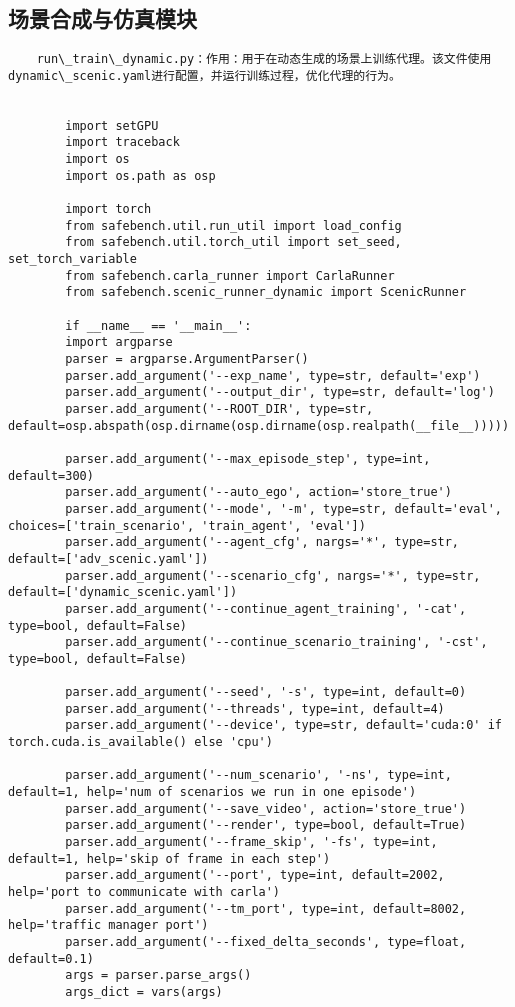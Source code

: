 \subsection*{场景合成与仿真模块}
\begin{lstlisting}
	run\_train\_dynamic.py：作用：用于在动态生成的场景上训练代理。该文件使用dynamic\_scenic.yaml进行配置，并运行训练过程，优化代理的行为。


		import setGPU
		import traceback
		import os
		import os.path as osp
		
		import torch 
		from safebench.util.run_util import load_config
		from safebench.util.torch_util import set_seed, set_torch_variable
		from safebench.carla_runner import CarlaRunner
		from safebench.scenic_runner_dynamic import ScenicRunner
		
		if __name__ == '__main__':
		import argparse
		parser = argparse.ArgumentParser()
		parser.add_argument('--exp_name', type=str, default='exp')
		parser.add_argument('--output_dir', type=str, default='log')
		parser.add_argument('--ROOT_DIR', type=str, default=osp.abspath(osp.dirname(osp.dirname(osp.realpath(__file__)))))
		
		parser.add_argument('--max_episode_step', type=int, default=300)
		parser.add_argument('--auto_ego', action='store_true')
		parser.add_argument('--mode', '-m', type=str, default='eval', choices=['train_scenario', 'train_agent', 'eval'])
		parser.add_argument('--agent_cfg', nargs='*', type=str, default=['adv_scenic.yaml'])
		parser.add_argument('--scenario_cfg', nargs='*', type=str, default=['dynamic_scenic.yaml'])
		parser.add_argument('--continue_agent_training', '-cat', type=bool, default=False)
		parser.add_argument('--continue_scenario_training', '-cst', type=bool, default=False)
		
		parser.add_argument('--seed', '-s', type=int, default=0)
		parser.add_argument('--threads', type=int, default=4)
		parser.add_argument('--device', type=str, default='cuda:0' if torch.cuda.is_available() else 'cpu')   
		
		parser.add_argument('--num_scenario', '-ns', type=int, default=1, help='num of scenarios we run in one episode')
		parser.add_argument('--save_video', action='store_true')
		parser.add_argument('--render', type=bool, default=True)
		parser.add_argument('--frame_skip', '-fs', type=int, default=1, help='skip of frame in each step')
		parser.add_argument('--port', type=int, default=2002, help='port to communicate with carla')
		parser.add_argument('--tm_port', type=int, default=8002, help='traffic manager port')
		parser.add_argument('--fixed_delta_seconds', type=float, default=0.1)
		args = parser.parse_args()
		args_dict = vars(args)
		

\end{lstlisting}
